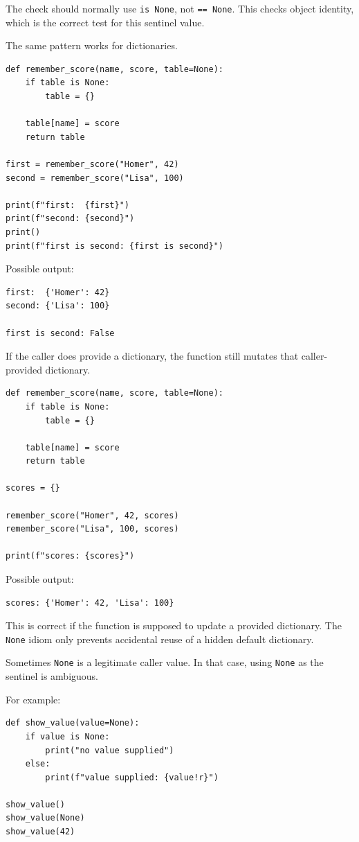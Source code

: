 The check should normally use \texttt{is None}, not \texttt{== None}. This checks object identity, which is the correct test for this sentinel value.

The same pattern works for dictionaries.

\begin{verbatim}
def remember_score(name, score, table=None):
    if table is None:
        table = {}

    table[name] = score
    return table

first = remember_score("Homer", 42)
second = remember_score("Lisa", 100)

print(f"first:  {first}")
print(f"second: {second}")
print()
print(f"first is second: {first is second}")
\end{verbatim}

Possible output:

\begin{verbatim}
first:  {'Homer': 42}
second: {'Lisa': 100}

first is second: False
\end{verbatim}

If the caller does provide a dictionary, the function still mutates that caller-provided dictionary.

\begin{verbatim}
def remember_score(name, score, table=None):
    if table is None:
        table = {}

    table[name] = score
    return table

scores = {}

remember_score("Homer", 42, scores)
remember_score("Lisa", 100, scores)

print(f"scores: {scores}")
\end{verbatim}

Possible output:

\begin{verbatim}
scores: {'Homer': 42, 'Lisa': 100}
\end{verbatim}

This is correct if the function is supposed to update a provided dictionary. The \texttt{None} idiom only prevents accidental reuse of a hidden default dictionary.

Sometimes \texttt{None} is a legitimate caller value. In that case, using \texttt{None} as the sentinel is ambiguous.

For example:

\begin{verbatim}
def show_value(value=None):
    if value is None:
        print("no value supplied")
    else:
        print(f"value supplied: {value!r}")

show_value()
show_value(None)
show_value(42)
\end{verbatim}

